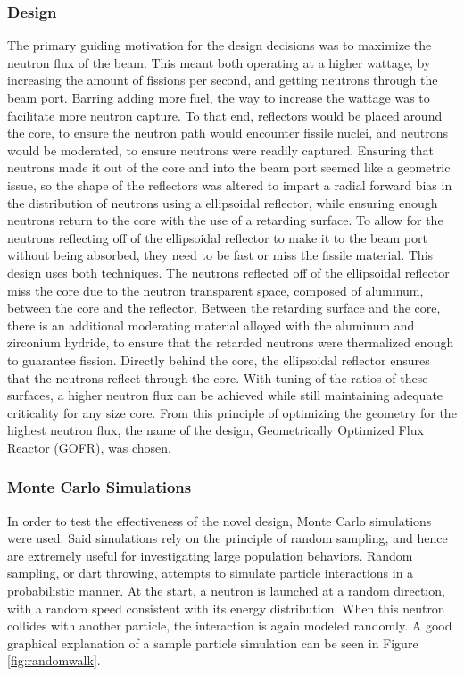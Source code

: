 \subsubsection{Design}

The primary guiding motivation for the design decisions was to maximize the neutron flux of the beam. This meant both operating at a higher wattage, by increasing the amount of fissions per second, and getting neutrons through the beam port. Barring adding more fuel, the way to increase the wattage was to facilitate more neutron capture. To that end, reflectors would be placed around the core, to ensure the neutron path would encounter fissile nuclei, and neutrons would be moderated, to ensure neutrons were readily captured. Ensuring that neutrons made it out of the core and into the beam port seemed like a geometric issue, so the shape of the reflectors was altered to impart a radial forward bias in the distribution of neutrons using a ellipsoidal reflector, while ensuring enough neutrons return to the core with the use of a retarding surface. To allow for the neutrons reflecting off of the ellipsoidal reflector to make it to the beam port without being absorbed, they need to be fast or miss the fissile material. This design uses both techniques. The neutrons reflected off of the ellipsoidal reflector miss the core due to the neutron transparent space, composed of aluminum, between the core and the reflector. Between the retarding surface and the core, there is an additional moderating material alloyed with the aluminum and zirconium hydride, to ensure that the retarded neutrons were thermalized enough to guarantee fission. Directly behind the core, the ellipsoidal reflector ensures that the neutrons reflect through the core. With tuning of the ratios of these surfaces, a higher neutron flux can be achieved while still maintaining adequate criticality for any size core. From this principle of optimizing the geometry for the highest neutron flux, the name of the design, Geometrically Optimized Flux Reactor (GOFR), was chosen.


\subsubsection{Monte Carlo Simulations}

In order to test the effectiveness of the novel design, Monte Carlo simulations were used. Said simulations rely on the principle of random sampling, and hence are extremely useful for investigating large population behaviors. Random sampling, or dart throwing, attempts to simulate particle interactions in a probabilistic manner. At the start, a neutron is launched at a random direction, with a random speed consistent with its energy distribution. When this neutron collides with another particle, the interaction is again modeled randomly. A good graphical explanation of a sample particle simulation can be seen in Figure \ref{fig:randomwalk}.

